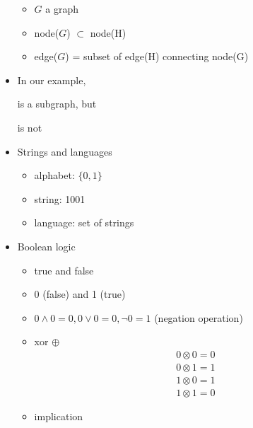 \begin{frame}[allowframebreaks]
\begin{itemize}
\begin{itemize}
\item $G$ a graph
\item node($G$) $\subset$ node(H)
\item edge($G$) = subset of edge(H) connecting node(G)
\end{itemize}
\item [] In our example,
  \begin{center}
\end{center}
is a subgraph, but
  \begin{center}
\end{center}
is not
\item Strings and languages
  \begin{itemize}
  \item alphabet: $\{0,1\}$
  \item string: 1001
  \item language: set of strings
  \end{itemize}
\item Boolean logic
  \begin{itemize}
  \item true and false
  \item 0 (false) and 1 (true)
  \item $0 \wedge 0 = 0, 0 \vee 0 = 0, \neg 0=1$ (negation operation)
  \item xor $\oplus$
    \begin{gather*}
      0 \otimes 0 = 0\\
0\otimes 1 = 1\\
1 \otimes 0 = 1\\
1\otimes 1 = 0
    \end{gather*}
  \item implication


\end{itemize}
\end{itemize}
\end{frame}
